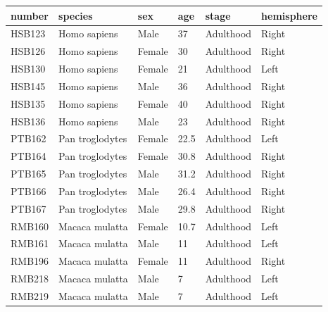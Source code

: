 \begin{refsection}
\begin{table}[H]
\small
{}\selectfont
{} \label{table3S11}
\centering
\begin{tabular}{@{}llllll@{}}
\hline
number & species         & sex    & age  & stage     & hemisphere \\ \hline
HSB123 & Homo sapiens    & Male   & 37   & Adulthood & Right      \\
HSB126 & Homo sapiens    & Female & 30   & Adulthood & Right      \\
HSB130 & Homo sapiens    & Female & 21   & Adulthood & Left       \\
HSB145 & Homo sapiens    & Male   & 36   & Adulthood & Right      \\
HSB135 & Homo sapiens    & Female & 40   & Adulthood & Right      \\
HSB136 & Homo sapiens    & Male   & 23   & Adulthood & Right      \\
PTB162 & Pan troglodytes & Female & 22.5 & Adulthood & Left       \\
PTB164 & Pan troglodytes & Female & 30.8 & Adulthood & Right      \\
PTB165 & Pan troglodytes & Male   & 31.2 & Adulthood & Right      \\
PTB166 & Pan troglodytes & Male   & 26.4 & Adulthood & Right      \\
PTB167 & Pan troglodytes & Male   & 29.8 & Adulthood & Right      \\
RMB160 & Macaca mulatta  & Female & 10.7 & Adulthood & Left       \\
RMB161 & Macaca mulatta  & Male   & 11   & Adulthood & Left       \\
RMB196 & Macaca mulatta  & Female & 11   & Adulthood & Right      \\
RMB218 & Macaca mulatta  & Male   & 7    & Adulthood & Left       \\
RMB219 & Macaca mulatta  & Male   & 7    & Adulthood & Left       \\ \hline
\end{tabular}
\end{table}



\end{refsection}
